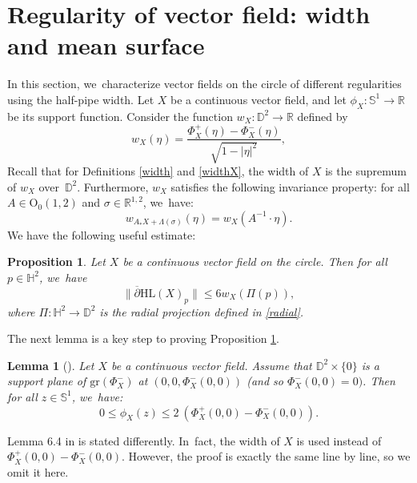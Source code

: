 \documentclass[10pt]{amsart}
\theoremstyle{plain}
\newtheorem{prop}[cor]{Proposition}
\newtheorem{lemma}[cor]{Lemma}
\theoremstyle{definition}
\newcommand{\minko}{\mathbb{R}^{1,2}}
\begin{document}
\section{Regularity of vector field: width and mean surface}\label{sec8_reg}
In this section, we~characterize vector fields on the circle of different regularities using the half-pipe width. Let $X$ be a continuous vector field, and let $\phi_X: \mathbb{S}^1 \to \mathbb{R}$ be its support function. Consider the function $w_X: \mathbb{D}^2 \to \mathbb{R}$ defined by
\begin{equation}\label{w_xz}
w_X(\eta) = \frac{\Phi_X^+(\eta) - \Phi_X^-(\eta)}{\sqrt{1 - \lvert \eta \rvert^2}},
\end{equation}
Recall that for Definitions \ref{width} and \ref{widthX}, the width of $X$ is the supremum of $w_X$ over~$\mathbb{D}^2$. Furthermore, $w_X$ satisfies the following invariance property: for all $A \in \mathrm{O}_0(1,2)$ and $\sigma \in \minko$, we~have:
\begin{equation}\label{eq_width_equivariant}
w_{A_*X+\Lambda(\sigma)}(\eta)=w_{X}(A^{-1}\cdot \eta).
\end{equation}
We have the following useful estimate:
\begin{prop}\label{prop_d_bar_less_width}
Let $X$ be a continuous vector field on the circle. Then for all $p \in \mathbb{H}^2$, we~have
\begin{equation}\label{eqq_d_bar_less_width}
\lVert \overline{\partial}\mathrm{HL}(X)_p \rVert \leq 6 w_X(\Pi(p)),
\end{equation}
where $\Pi: \mathbb{H}^2 \to \mathbb{D}^2$ is the radial projection defined in \eqref{radial}.
\end{prop}

The next lemma is a key step to proving Proposition \ref{prop_d_bar_less_width}.

\begin{lemma}[{\cite[Lem.\,6.4]{diaf2023Infearth}}]\label{simple_resultt}
Let $X$ be a continuous vector field. Assume that $\mathbb{D}^2 \times \{0\}$ is a support plane of $\mathrm{gr}(\Phi_X^-)$ at $(0, 0, \Phi_X^{-}(0, 0))$ (and so $\Phi^-_X(0, 0) = 0)$. Then for all $z \in \mathbb{S}^1$, we~have:
\begin{equation}\label{eq_phi_less_width}
0\leq\phi_X(z)\leq 2 \ (\Phi_X^+(0,0)-\Phi_X^-(0,0)).
\end{equation}
\end{lemma}

Lemma 6.4 in \cite{diaf2023Infearth} is stated differently. In~fact, the width of \(X \) is used instead of \(\Phi_X^+(0,0) - \Phi_X^-(0,0) \). However, the proof is exactly the same line by line, so we omit it here.
\end{document}
